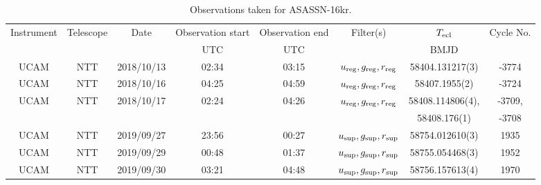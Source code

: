 \begin{table}
	\begin{center}
		\begin{tabular}{cccccccc}
			\hline
			Instrument & Telescope & Date & Observation start & Observation end & Filter(s) & $T_{\rm ecl}$ & Cycle No. \\
			 &  &  & UTC & UTC &  & BMJD &  \\
			\hline
			\hline
			UCAM & NTT & 2018/10/13 & 02:34 & 03:15 & $u_{\rm reg},g_{\rm reg},r_{\rm reg}$ & 58404.131217(3)  & -3774  \\
			UCAM & NTT & 2018/10/16 & 04:25 & 04:59 & $u_{\rm reg},g_{\rm reg},r_{\rm reg}$ & 58407.1955(2)    & -3724  \\
			UCAM & NTT & 2018/10/17 & 02:24 & 04:26 & $u_{\rm reg},g_{\rm reg},r_{\rm reg}$ & 58408.114806(4), & -3709, \\
			     &     &            &       &       &                                       &  58408.176(1)    & -3708  \\
			UCAM & NTT & 2019/09/27 & 23:56 & 00:27 & $u_{\rm sup},g_{\rm sup},r_{\rm sup}$ & 58754.012610(3)  & 1935   \\
			UCAM & NTT & 2019/09/29 & 00:48 & 01:37 & $u_{\rm sup},g_{\rm sup},r_{\rm sup}$ & 58755.054468(3)  & 1952   \\
			UCAM & NTT & 2019/09/30 & 03:21 & 04:48 & $u_{\rm sup},g_{\rm sup},r_{\rm sup}$ & 58756.157613(4)  & 1970   \\
		   \hline
		\end{tabular}
	\end{center}
	\caption{Observations taken for ASASSN-16kr.}
	\label{table:observing:observation logs ASASSN-16kr}
\end{table}